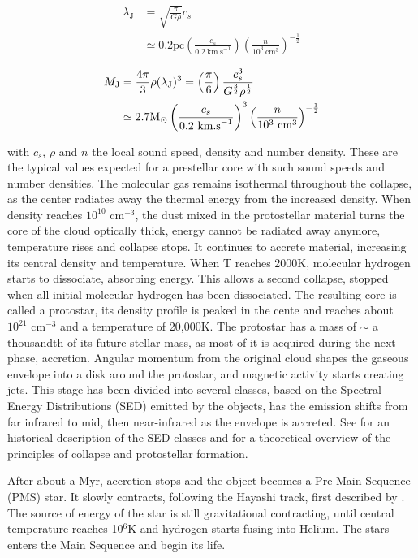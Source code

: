 \begin{align}
\lambda_\textrm{J} & = \sqrt{\frac{\pi}{G \rho}} c_s \\
	 & \simeq  0.2 \textrm{pc} \left( \frac{c_s}{0.2 ~ \textrm{km.s}^{-1}} \right) \left( \frac{n}{10^3 ~ \textrm{cm}^3} \right)^{-\frac{1}{2}}
\end{align}

\begin{align}
M_\textrm{J} &=  \frac{4 \pi}{3} \rho ( \lambda_\textrm{J} )^3 =    \left( \frac{\pi}{6} \right) \frac{c_s^3}{G^\frac{3}{2}\rho^\frac{1}{2}} \\
 & \simeq  2.7 {\textrm{M}_\odot} \left( \frac{c_s}{0.2 ~ \textrm{km.s}^{-1}} \right)^3 \left( \frac{n}{10^3 ~ \textrm{cm}^3} \right)^{-\frac{1}{2}}
\end{align}

with $c_s$, $\rho$ and $n$ the local sound speed, density and number density. These are the typical values expected for a prestellar core with such sound speeds and number densities. The molecular gas remains isothermal throughout the collapse, as the center radiates away the thermal energy from the increased density. When density reaches $10^10$ cm$^{-3}$, the dust mixed in the protostellar material turns the core of the cloud optically thick, energy cannot be radiated away anymore, temperature rises and collapse stops. It continues to accrete material, increasing its central density and temperature. When T reaches 2000K, molecular hydrogen starts to dissociate, absorbing energy. This allows a second collapse, stopped when all initial molecular hydrogen has been dissociated. The resulting core is called a protostar, its density profile is peaked in the cente and reaches about $10^{21}$ cm$^{-3}$ and a temperature of 20,000K. The protostar has a mass of $\sim$ a thousandth of its future stellar mass, as most of it is acquired during the next phase, accretion. Angular momentum from the original cloud shapes the gaseous envelope into a disk around the protostar, and magnetic activity starts creating jets. This stage has been divided into several classes, based on the Spectral Energy Distributions (SED) emitted by the objects, has the emission shifts from far infrared to mid, then near-infrared as the envelope is accreted. See \cite{Evans2009} for an historical description of the SED classes and \cite{Larson1969} for a theoretical overview of the principles of collapse and protostellar formation. 

After about a Myr, accretion stops and the object becomes a Pre-Main Sequence (PMS) star. It slowly contracts, following the Hayashi track, first described by \cite{Hayashi1961}. The source of energy of the star is still gravitational contracting, until central temperature reaches 10$^6$K and hydrogen starts fusing into Helium. The stars enters the Main Sequence and begin its life.


